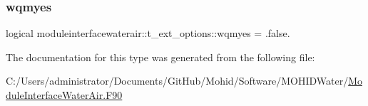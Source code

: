 \subsubsection{\texorpdfstring{wqmyes}{wqmyes}}
{\footnotesize\ttfamily logical moduleinterfacewaterair\+::t\+\_\+ext\+\_\+options\+::wqmyes = .false.\hspace{0.3cm}{\ttfamily [private]}}



The documentation for this type was generated from the following file\+:\begin{DoxyCompactItemize}
\item 
C\+:/\+Users/administrator/\+Documents/\+Git\+Hub/\+Mohid/\+Software/\+M\+O\+H\+I\+D\+Water/\mbox{\hyperlink{_module_interface_water_air_8_f90}{Module\+Interface\+Water\+Air.\+F90}}\end{DoxyCompactItemize}
